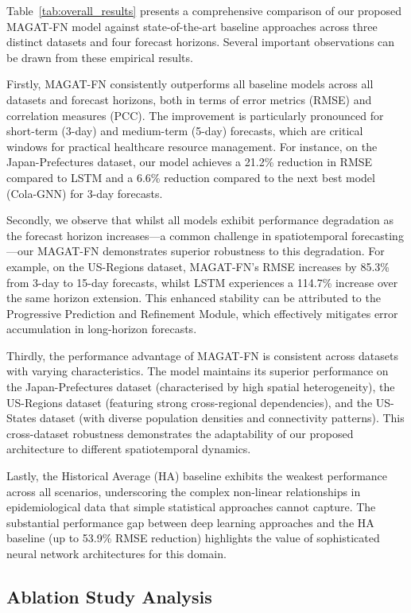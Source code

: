 \documentclass[lettersize, journal]{IEEEtran}
\begin{document}
Table~\ref{tab:overall_results} presents a comprehensive comparison of our proposed MAGAT-FN model against state-of-the-art baseline approaches across three distinct datasets and four forecast horizons. Several important observations can be drawn from these empirical results.

Firstly, MAGAT-FN consistently outperforms all baseline models across all datasets and forecast horizons, both in terms of error metrics (RMSE) and correlation measures (PCC). The improvement is particularly pronounced for short-term (3-day) and medium-term (5-day) forecasts, which are critical windows for practical healthcare resource management. For instance, on the Japan-Prefectures dataset, our model achieves a 21.2\% reduction in RMSE compared to LSTM and a 6.6\% reduction compared to the next best model (Cola-GNN) for 3-day forecasts.

Secondly, we observe that whilst all models exhibit performance degradation as the forecast horizon increases—a common challenge in spatiotemporal forecasting—our MAGAT-FN demonstrates superior robustness to this degradation. For example, on the US-Regions dataset, MAGAT-FN's RMSE increases by 85.3\% from 3-day to 15-day forecasts, whilst LSTM experiences a 114.7\% increase over the same horizon extension. This enhanced stability can be attributed to the Progressive Prediction and Refinement Module, which effectively mitigates error accumulation in long-horizon forecasts.

Thirdly, the performance advantage of MAGAT-FN is consistent across datasets with varying characteristics. The model maintains its superior performance on the Japan-Prefectures dataset (characterised by high spatial heterogeneity), the US-Regions dataset (featuring strong cross-regional dependencies), and the US-States dataset (with diverse population densities and connectivity patterns). This cross-dataset robustness demonstrates the adaptability of our proposed architecture to different spatiotemporal dynamics.

Lastly, the Historical Average (HA) baseline exhibits the weakest performance across all scenarios, underscoring the complex non-linear relationships in epidemiological data that simple statistical approaches cannot capture. The substantial performance gap between deep learning approaches and the HA baseline (up to 53.9\% RMSE reduction) highlights the value of sophisticated neural network architectures for this domain.

\subsection{Ablation Study Analysis}
\end{document}
